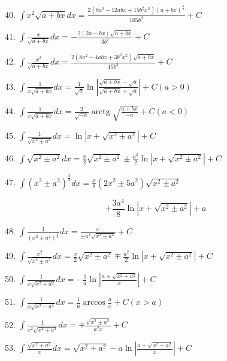 \documentclass[lang=cn,newtx,12pt,scheme=chinese]{elegantbook}
\begin{document}
40. \(\int {x}^{2}\sqrt{a + {bx}}{dx} = \frac{2\left( {8{a}^{2} - {12abx} + {15}{b}^{2}{x}^{2}}\right) {\left( a + bx\right) }^{\frac{3}{2}}}{{105}{b}^{3}} + C\)

41. \(\int \frac{x}{\sqrt{a + {bx}}}{dx} = - \frac{2\left( {{2a} - {bx}}\right) \sqrt{a + {bx}}}{3{b}^{2}} + C\)

42. \(\int \frac{{x}^{2}}{\sqrt{a + {bx}}}{dx} = \frac{2\left( {8{a}^{2} - {4abx} + 3{b}^{2}{x}^{2}}\right) \sqrt{a + {bx}}}{{15}{b}^{3}} + C\)

43. \(\int \frac{1}{x\sqrt{a + {bx}}}{dx} = \frac{1}{\sqrt{a}}\ln \left| \frac{\sqrt{a + {bx}} - \sqrt{a}}{\sqrt{a + {bx}} + \sqrt{a}}\right| + C\left( {a > 0}\right)\)

44. \(\int \frac{1}{x\sqrt{a + {bx}}}{dx} = \frac{2}{\sqrt{-a}}\operatorname{arctg}\sqrt{\frac{a + {bx}}{-a}} + C\left( {a < 0}\right)\)

45. \(\int \frac{1}{\sqrt{{x}^{2} \pm {a}^{2}}}{dx} = \ln \left| {x + \sqrt{{x}^{2} \pm {a}^{2}}}\right| + C\)

46. \(\int \sqrt{{x}^{2} \pm {a}^{2}}{dx} = \frac{x}{2}\sqrt{{x}^{2} \pm {a}^{2}} \pm \frac{{a}^{2}}{2}\ln \left| {x + \sqrt{{x}^{2} \pm {a}^{2}}}\right| + C\)

47. \(\int {\left( {x}^{2} \pm {a}^{2}\right) }^{\frac{3}{2}}{dx} = \frac{x}{8}\left( {2{x}^{2} \pm 5{a}^{2}}\right) \sqrt{{x}^{2} \pm {a}^{2}}\)

\[
+ \frac{3{a}^{4}}{8}\ln \left| {x + \sqrt{{x}^{2} \pm {a}^{2}}}\right| + a
\]

48. \(\int \frac{1}{{\left( {x}^{2} \pm {a}^{2}\right) }^{\frac{3}{2}}}{dx} = \frac{x}{\pm {a}^{2}\sqrt{{x}^{2} \pm {a}^{2}}} + C\)

49. \(\int \frac{{x}^{2}}{\sqrt{{x}^{2} \pm {a}^{2}}}{dx} = \frac{x}{2}\sqrt{{x}^{2} \pm {a}^{2}} \mp \frac{{a}^{2}}{2}\ln \left| {x + \sqrt{{x}^{2} \pm {a}^{2}}}\right| + C\)

50. \(\int \frac{1}{x\sqrt{{x}^{2} + {a}^{2}}}{dx} = - \frac{1}{a}\ln \left| \frac{a + \sqrt{{x}^{2} + {a}^{2}}}{x}\right| + C\)

51. \(\int \frac{1}{x\sqrt{{x}^{2} - {a}^{2}}}{dx} = \frac{1}{a}\arccos \frac{a}{x} + C\left( {x > a}\right)\)

52. \(\int \frac{1}{{x}^{2}\sqrt{{x}^{2} \pm {a}^{2}}}{dx} = \mp \frac{\sqrt{{x}^{2} \pm {a}^{2}}}{{a}^{2}x} + C\)

53. \(\int \frac{\sqrt{{x}^{2} + {a}^{2}}}{x}{dx} = \sqrt{{x}^{2} + {a}^{2}} - a\ln \left| \frac{a + \sqrt{{x}^{2} + {a}^{2}}}{x}\right| + C\)
\end{document}
